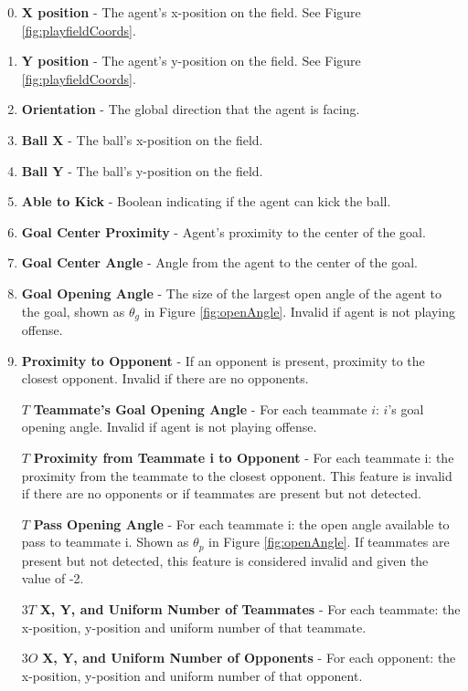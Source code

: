 \documentclass[12pt]{article}
\begin{document}
\begin{enumerate}[noitemsep]
\setcounter{enumi}{-1}
\item{\textbf{X position} - The agent’s x-position on the field. See
  Figure \ref{fig:playfieldCoords}.}
\item{\textbf{Y position} - The agent’s y-position on the field. See
  Figure \ref{fig:playfieldCoords}.}
\item{\textbf{Orientation} - The global direction that the agent is facing.}
\item{\textbf{Ball X} - The ball's x-position on the field.}
\item{\textbf{Ball Y} - The ball's y-position on the field.}
\item{\textbf{Able to Kick} - Boolean indicating if the agent can kick the ball.}
\item{\textbf{Goal Center Proximity} - Agent's proximity to the center of the goal.}
\item{\textbf{Goal Center Angle} - Angle from the agent to the center of the goal.}
\item{\textbf{Goal Opening Angle} - The size of the largest open angle
  of the agent to the goal, shown as $\theta_g$ in Figure
  \ref{fig:openAngle}. Invalid if agent is not playing offense.}
\item{\textbf{Proximity to Opponent} - If an opponent is present,
  proximity to the closest opponent. Invalid if there are no
  opponents.}
\item [$T$] {\textbf{Teammate's Goal Opening Angle} - For each
  teammate $i$: $i$’s goal opening angle. Invalid if agent is not
  playing offense.}
\item [$T$] {\textbf{Proximity from Teammate i to Opponent} - For each
  teammate i: the proximity from the teammate to the closest
  opponent. This feature is invalid if there are no opponents or if
  teammates are present but not detected.}
\item [$T$] {\textbf{Pass Opening Angle} - For each teammate i: the open
  angle available to pass to teammate i. Shown as $\theta_p$ in Figure
  \ref{fig:openAngle}. If teammates are present but not detected, this
  feature is considered invalid and given the value of -2.}
\item [$3T$] {\textbf{X, Y, and Uniform Number of
    Teammates} - For each teammate: the x-position, y-position and
  uniform number of that teammate.}
\item [$3O$] {\textbf{X, Y, and Uniform Number of
    Opponents} - For each opponent: the x-position, y-position and
  uniform number of that opponent.}
\end{enumerate}
\end{document}
